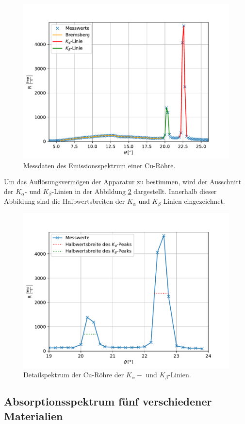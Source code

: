 \begin{figure}[H]
  \centering
  \includegraphics{content/Plots/Emissionsspektrum.pdf}
  \caption{Messdaten des Emissionsspektrum einer Cu-Röhre.}
  \label{fig:Emissionsspektrum}
\end{figure}
Um das Auflösungsvermögen der Apparatur zu bestimmen, wird der Ausschnitt der $K_{\alpha}$-
und $K_{\beta}$-Linien in der Abbildung \ref{fig:Detailspektrum} dargestellt. Innerhalb dieser Abbildung
sind die Halbwertsbreiten der $K_{\alpha}$ und $K_{\beta}$-Linien eingezeichnet. 
\begin{figure}[H]
  \centering
  \includegraphics{content/Plots/Detailspektrum.pdf}
  \caption{Detailspektrum der Cu-Röhre der $K_{\alpha}-$ und $K_{\beta}$-Linien.}
  \label{fig:Detailspektrum}
\end{figure}

\subsection{Absorptionsspektrum fünf verschiedener Materialien}
